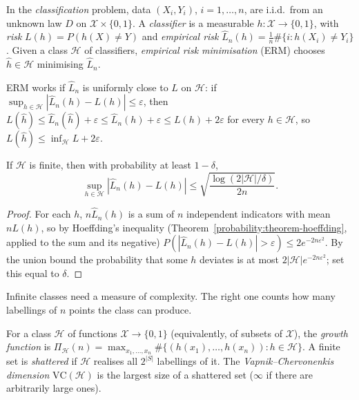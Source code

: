 \begin{definition}\label{statistics:definition-learning}
In the \emph{classification} problem, data $(X_i, Y_i)$, $i = 1, \ldots, n$, are i.i.d.\ from an unknown law $D$ on $\mathcal{X} \times \{0, 1\}$. A \emph{classifier} is a measurable $h \colon \mathcal{X} \to \{0, 1\}$, with \emph{risk}
$L(h) = P(h(X) \neq Y)$ and \emph{empirical risk} $\hat L_n(h) = \frac1n\#\{i : h(X_i) \neq Y_i\}$. Given a class $\mathcal{H}$ of classifiers, \emph{empirical risk minimisation} (ERM) chooses $\hat h \in \mathcal{H}$ minimising
$\hat L_n$.
\end{definition}

ERM works if $\hat L_n$ is uniformly close to $L$ on $\mathcal{H}$: if $\sup_{h \in \mathcal{H}}|\hat L_n(h) - L(h)| \leq \varepsilon$, then $L(\hat h) \leq \hat L_n(\hat h) + \varepsilon \leq \hat L_n(h) + \varepsilon \leq L(h) + 2\varepsilon$ for every
$h \in \mathcal{H}$, so $L(\hat h) \leq \inf_{\mathcal{H}}L + 2\varepsilon$.

\begin{proposition}\label{statistics:proposition-finite-class}
If $\mathcal{H}$ is finite, then with probability at least $1 - \delta$,
\[
\sup_{h \in \mathcal{H}}|\hat L_n(h) - L(h)| \leq \sqrt{\frac{\log(2|\mathcal{H}|/\delta)}{2n}}.
\]
\end{proposition}

\begin{proof}
For each $h$, $n\hat L_n(h)$ is a sum of $n$ independent indicators with mean $nL(h)$, so by Hoeffding's inequality (Theorem~\ref{probability:theorem-hoeffding}, applied to the sum and its negative)
$P(|\hat L_n(h) - L(h)| > \varepsilon) \leq 2e^{-2n\varepsilon^2}$. By the union bound the probability that some $h$ deviates is at most $2|\mathcal{H}|e^{-2n\varepsilon^2}$; set this equal to $\delta$.
\end{proof}

Infinite classes need a measure of complexity. The right one counts how many labellings of $n$ points the class can produce.

\begin{definition}\label{statistics:definition-vc}
For a class $\mathcal{H}$ of functions $\mathcal{X} \to \{0, 1\}$ (equivalently, of subsets of $\mathcal{X}$), the \emph{growth function} is $\Pi_{\mathcal{H}}(n) = \max_{x_1, \ldots, x_n}\#\{(h(x_1), \ldots, h(x_n)) : h \in \mathcal{H}\}$. A finite set is
\emph{shattered} if $\mathcal{H}$ realises all $2^{|S|}$ labellings of it. The \emph{Vapnik--Chervonenkis dimension} $\mathrm{VC}(\mathcal{H})$ is the largest size of a shattered set ($\infty$ if there are arbitrarily large ones).
\end{definition}

